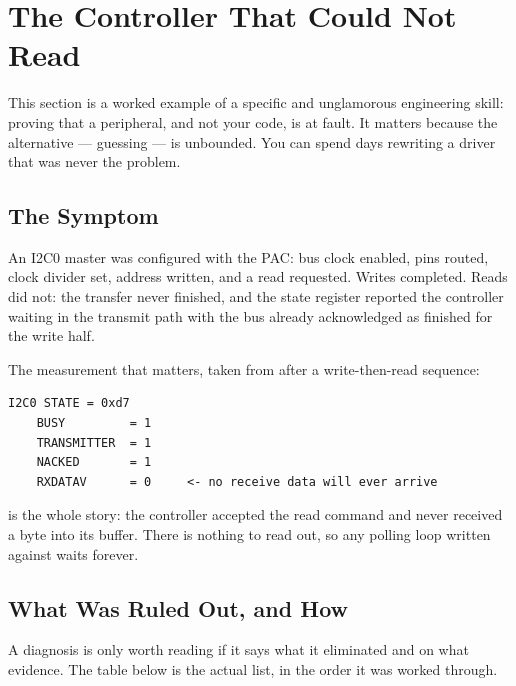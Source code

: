 \section{The Controller That Could Not Read}
\label{sec:i2c-controller-cannot-read}

This section is a worked example of a specific and unglamorous engineering skill: proving
that a peripheral, and not your code, is at fault. It matters because the alternative —
guessing — is unbounded. You can spend days rewriting a driver that was never the problem.

\subsection{The Symptom}

An I2C0 master was configured with the PAC: bus clock enabled, pins routed, clock divider
set, address written, and a read requested. Writes completed. Reads did not: the transfer
never finished, and the state register reported the controller waiting in the transmit path
with the bus already acknowledged as finished for the write half.

The measurement that matters, taken from  after a write-then-read
sequence:

\begin{verbatim}
I2C0 STATE = 0xd7
    BUSY         = 1
    TRANSMITTER  = 1
    NACKED       = 1
    RXDATAV      = 0     <- no receive data will ever arrive
\end{verbatim}

 is the whole story: the controller accepted the read command and
never received a byte into its buffer. There is nothing to read out, so any polling loop
written against  waits forever.

\subsection{What Was Ruled Out, and How}

A diagnosis is only worth reading if it says what it eliminated and on what evidence. The
table below is the actual list, in the order it was worked through.

